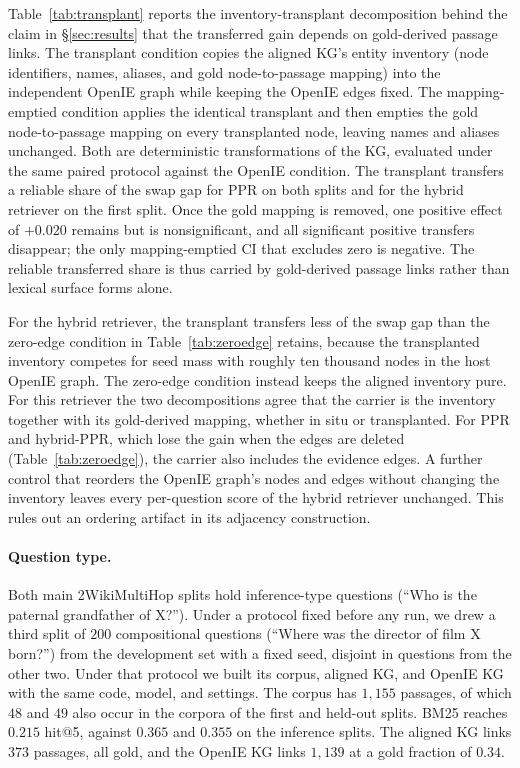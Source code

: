 \documentclass[11pt]{article}
\begin{document}
Table~\ref{tab:transplant} reports the inventory-transplant decomposition behind the claim in \S\ref{sec:results} that the transferred gain depends on gold-derived passage links. The transplant condition copies the aligned KG's entity inventory (node identifiers, names, aliases, and gold node-to-passage mapping) into the independent OpenIE graph while keeping the OpenIE edges fixed. The mapping-emptied condition applies the identical transplant and then empties the gold node-to-passage mapping on every transplanted node, leaving names and aliases unchanged. Both are deterministic transformations of the KG, evaluated under the same paired protocol against the OpenIE condition. The transplant transfers a reliable share of the swap gap for PPR on both splits and for the hybrid retriever on the first split. Once the gold mapping is removed, one positive effect of $+0.020$ remains but is nonsignificant, and all significant positive transfers disappear; the only mapping-emptied CI that excludes zero is negative. The reliable transferred share is thus carried by gold-derived passage links rather than lexical surface forms alone.

For the hybrid retriever, the transplant transfers less of the swap gap than the zero-edge condition in Table~\ref{tab:zeroedge} retains, because the transplanted inventory competes for seed mass with roughly ten thousand nodes in the host OpenIE graph. The zero-edge condition instead keeps the aligned inventory pure. For this retriever the two decompositions agree that the carrier is the inventory together with its gold-derived mapping, whether in situ or transplanted. For PPR and hybrid-PPR, which lose the gain when the edges are deleted (Table~\ref{tab:zeroedge}), the carrier also includes the evidence edges. A further control that reorders the OpenIE graph's nodes and edges without changing the inventory leaves every per-question score of the hybrid retriever unchanged. This rules out an ordering artifact in its adjacency construction.

\paragraph{Question type.} Both main 2WikiMultiHop splits hold inference-type questions (``Who is the paternal grandfather of X?''). Under a protocol fixed before any run, we drew a third split of $200$ compositional questions (``Where was the director of film X born?'') from the development set with a fixed seed, disjoint in questions from the other two. Under that protocol we built its corpus, aligned KG, and OpenIE KG with the same code, model, and settings. The corpus has $1{,}155$ passages, of which $48$ and $49$ also occur in the corpora of the first and held-out splits. BM25 reaches $0.215$ hit@5, against $0.365$ and $0.355$ on the inference splits. The aligned KG links $373$ passages, all gold, and the OpenIE KG links $1{,}139$ at a gold fraction of $0.34$.
\end{document}

